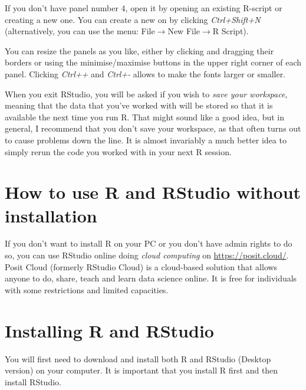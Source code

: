\documentclass[
  12pt,
  oneside]{book}
\theoremstyle{definition}
\theoremstyle{definition}
\theoremstyle{definition}
\theoremstyle{definition}
\theoremstyle{remark}
\begin{document}
If you don't have panel number 4, open it by opening an existing R-script or creating a new one. You can create a new on by clicking \emph{Ctrl+Shift+N} (alternatively, you can use the menu: File\(\rightarrow\)New File\(\rightarrow\)R Script).

You can resize the panels as you like, either by clicking and dragging their borders or using the minimise/maximise buttons in the upper right corner of each panel. Clicking \emph{Ctrl++} and \emph{Ctrl+-} allows to make the fonts larger or smaller.

When you exit RStudio, you will be asked if you wish to \emph{save your workspace}, meaning that the data that you've worked with will be stored so that it is available the next time you run R. That might sound like a good idea, but in general, I recommend that you don't save your workspace, as that often turns out to cause problems down the line. It is almost invariably a much better idea to simply rerun the code you worked with in your next R session.

\hypertarget{how-to-use-r-and-rstudio-without-installation}{%
\section{How to use R and RStudio without installation}\label{how-to-use-r-and-rstudio-without-installation}}

If you don't want to install R on your PC or you don't have admin rights to do so, you can use RStudio online doing \emph{cloud computing} on \url{https://posit.cloud/}.
Posit Cloud (formerly RStudio Cloud) is a cloud-based solution that allows anyone to do, share, teach and learn data science online. It is free for individuals with some restrictions and limited capacities.

\hypertarget{installing}{%
\section{Installing R and RStudio}\label{installing}}

You will first need to download and install both R and RStudio (Desktop version) on your computer. It is important that you install R first and then install RStudio.
\end{document}
